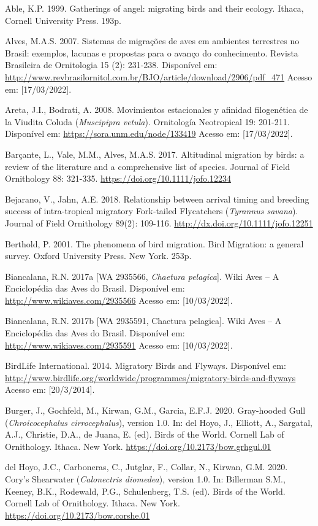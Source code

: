 \documentclass[
  oneside]{scrbook}
\begin{document}
Able, K.P. 1999. Gatherings of angel: migrating birds and their ecology. Ithaca, Cornell University Press. 193p.

Alves, M.A.S. 2007. Sistemas de migrações de aves em ambientes terrestres no Brasil: exemplos, lacunas e propostas para o avanço do conhecimento. Revista Brasileira de Ornitologia 15 (2): 231-238. Disponível em: \url{http://www.revbrasilornitol.com.br/BJO/article/download/2906/pdf_471} Acesso em: {[}17/03/2022{]}.

Areta, J.I., Bodrati, A. 2008. Movimientos estacionales y afinidad filogenética de la Viudita Coluda (\emph{Muscipipra vetula}). Ornitología Neotropical 19: 201-211. Disponível em: \url{https://sora.unm.edu/node/133419} Acesso em: {[}17/03/2022{]}.

Barçante, L., Vale, M.M., Alves, M.A.S. 2017. Altitudinal migration by birds: a review of the literature and a comprehensive list of species. Journal of Field Ornithology 88: 321-335. \url{https://doi.org/10.1111/jofo.12234}

Bejarano, V., Jahn, A.E. 2018. Relationship between arrival timing and breeding success of intra‐tropical migratory Fork‐tailed Flycatchers (\emph{Tyrannus savana}). Journal of Field Ornithology 89(2): 109-116. \url{http://dx.doi.org/10.1111/jofo.12251}

Berthold, P. 2001. The phenomena of bird migration. Bird Migration: a general survey. Oxford University Press. New York. 253p.

Biancalana, R.N. 2017a {[}WA 2935566, \emph{Chaetura pelagica}{]}. Wiki Aves -- A Enciclopédia das Aves do Brasil. Disponível em: \url{http://www.wikiaves.com/2935566} Acesso em: {[}10/03/2022{]}.

Biancalana, R.N. 2017b {[}WA 2935591, Chaetura pelagica{]}. Wiki Aves -- A Enciclopédia das Aves do Brasil. Disponível em: \url{http://www.wikiaves.com/2935591} Acesso em: {[}10/03/2022{]}.

BirdLife International. 2014. Migratory Birds and Flyways. Disponível em: \url{http://www.birdlife.org/worldwide/programmes/migratory-birds-and-flyways} Acesso em: {[}20/3/2014{]}.

Burger, J., Gochfeld, M., Kirwan, G.M., Garcia, E.F.J. 2020. Gray-hooded Gull (\emph{Chroicocephalus cirrocephalus}), version 1.0. In: del Hoyo, J., Elliott, A., Sargatal, A.J., Christie, D.A., de Juana, E. (ed). Birds of the World. Cornell Lab of Ornithology. Ithaca. New York. \url{https://doi.org/10.2173/bow.grhgul.01}

del Hoyo, J.C., Carboneras, C., Jutglar, F., Collar, N., Kirwan, G.M. 2020. Cory's Shearwater (\emph{Calonectris diomedea}), version 1.0. In: Billerman S.M., Keeney, B.K., Rodewald, P.G., Schulenberg, T.S. (ed). Birds of the World. Cornell Lab of Ornithology. Ithaca. New York. \url{https://doi.org/10.2173/bow.corshe.01}
\end{document}
